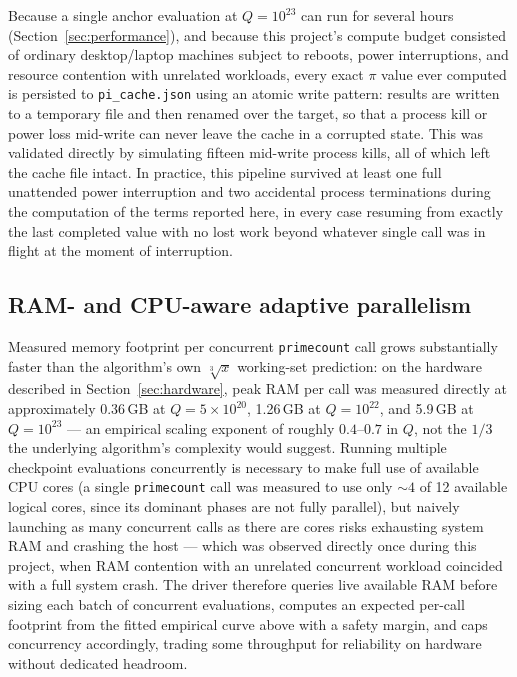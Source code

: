 \documentclass[11pt]{amsart}
\newcommand{\pcount}{\pi}
\begin{document}
Because a single anchor evaluation at $Q=10^{23}$ can run for several
hours (Section~\ref{sec:performance}), and because this project's
compute budget consisted of ordinary desktop/laptop machines subject to
reboots, power interruptions, and resource contention with unrelated
workloads, every exact $\pcount$ value ever computed is persisted to
\texttt{pi\_cache.json} using an atomic write pattern: results are
written to a temporary file and then renamed over the target, so that a
process kill or power loss mid-write can never leave the cache in a
corrupted state. This was validated directly by simulating fifteen
mid-write process kills, all of which left the cache file intact. In
practice, this pipeline survived at least one full unattended power
interruption and two accidental process terminations during the
computation of the terms reported here, in every case resuming from
exactly the last completed value with no lost work beyond whatever
single call was in flight at the moment of interruption.

\subsection{RAM- and CPU-aware adaptive parallelism}

Measured memory footprint per concurrent \texttt{primecount} call grows
substantially faster than the algorithm's own $\sqrt[3]{x}$ working-set
prediction: on the hardware described in Section~\ref{sec:hardware},
peak RAM per call was measured directly at approximately 0.36\,GB at
$Q=5\times10^{20}$, 1.26\,GB at $Q=10^{22}$, and 5.9\,GB at $Q=10^{23}$
--- an empirical scaling exponent of roughly $0.4$--$0.7$ in $Q$, not the
$1/3$ the underlying algorithm's complexity would suggest. Running
multiple checkpoint evaluations concurrently is necessary to make full
use of available CPU cores (a single \texttt{primecount} call was
measured to use only $\sim\!4$ of 12 available logical cores, since its
dominant phases are not fully parallel), but naively launching as many
concurrent calls as there are cores risks exhausting system RAM and
crashing the host --- which was observed directly once during this
project, when RAM contention with an unrelated concurrent workload
coincided with a full system crash. The driver therefore queries live
available RAM before sizing each batch of concurrent evaluations,
computes an expected per-call footprint from the fitted empirical curve
above with a safety margin, and caps concurrency accordingly, trading
some throughput for reliability on hardware without dedicated headroom.
\end{document}
